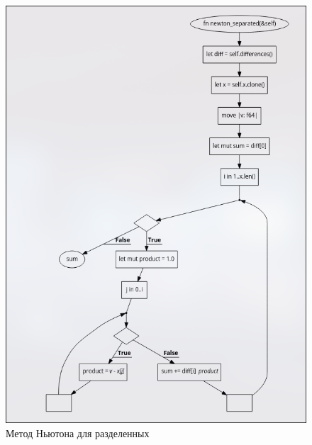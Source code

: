\documentclass{article}
\begin{document}
                \begin{figure}[H]
                      \centering
                      \includegraphics[width=360pt]{alg2.png}
                      \caption[Схема-1]{Метод Ньютона для разделенных}
                      \label{fig:screenshot002}
                \end{figure}    
\end{document}
